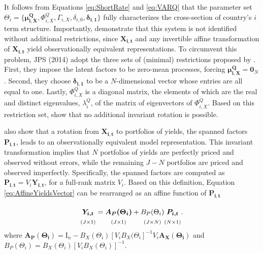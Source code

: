 It follows from Equations \eqref{eq:ShortRate} and \eqref{eq:VARQ} that the parameter set \(\Theta_i =\{\boldsymbol{\mu^Q_{i,X}},\Phi^Q_{i,X}, \Gamma_{i,X}, \delta_{i,0}, \boldsymbol{\delta_{i,1}}\}\) fully characterizes the cross-section of country's \(i\) term structure. Importantly, \citet{DaiSingleton2000} demonstrate that this system is not identified without additional restrictions, since \(\boldsymbol{X_{i,t}}\) and any invertible affine transformation of \(\boldsymbol{X_{i,t}}\) yield observationally equivalent representations. To circumvent this problem, JPS (2014) adopt the three sets of (minimal) restrictions proposed by \citet{JoslinSingletonZhu2011}. First, they impose the latent factors to be zero-mean processes, forcing \(\boldsymbol{\mu^{Q}_{i,X}}= \boldsymbol{0}_N\). Second, they choose \(\boldsymbol{\delta_{i,1}}\) to be a \(N\)-dimensional vector whose entries are all equal to one. Lastly, \(\Phi^Q_{i,X}\) is a diagonal matrix, the elements of which are the real and distinct eigenvalues, \(\lambda^Q_i\), of the matrix of eigenvectors of \(\Phi^Q_{i,X}\). Based on this restriction set, \citet{JoslinSingletonZhu2011} show that no additional invariant rotation is possible.

\citet{JoslinSingletonZhu2011} also show that a rotation from \(\boldsymbol{X_{i,t}}\) to portfolios of yields, the spanned factors \(\boldsymbol{P_{i,t}}\), leads to an observationally equivalent model representation. This invariant transformation implies that \(N\) portfolios of yields are perfectly priced and observed without errors, while the remaining \(J-N\) portfolios are priced and observed imperfectly. Specifically, the spanned factors are computed as \(\boldsymbol{P_{i,t}}=V_i\boldsymbol{Y_{i,t}}\), for a full-rank matrix \(V_i\). Based on this definition, Equation \eqref{eq:AffineYieldsVector} can be rearranged as an affine function of \(\boldsymbol{P_{i,t}}\)

\begin{equation}
    \underset{(J \times 1)}{\vphantom{\Big|}
    \boldsymbol{Y_{i,t}}}=
    \underset{(J \times 1)}{\vphantom{\Big|}
    \boldsymbol{A_P(\Theta_i)}}+
    \underset{(J \times N)}{\vphantom{\Big|}
    B_P(\Theta_i)}
    \underset{(N \times 1)}{\vphantom{\Big|}
    \boldsymbol{P_{i,t}}}\text{.}
    \label{eq:AffineYieldsSpanned}
\end{equation}
where \(\boldsymbol{A_P(\Theta_i)}= \mathrm{I}_n - B_X(\Theta_i ) \left[ V_iB_X(\Theta_i \right] ^{-1}V_i \boldsymbol{A_X(\Theta_i)}\) and
\(B_P(\Theta_i)=B_X(\Theta_i) \left[ V_iB_X(\Theta_i ) \right]^{-1}\).

